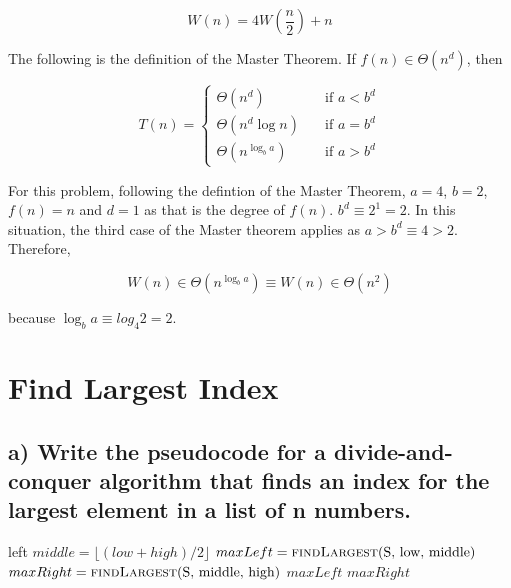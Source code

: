 \documentclass[11pt]{article}
\begin{document}
\begin{equation*}
W(n) = 4W(\frac{n}{2}) +n
\end{equation*}


\bigskip
\bigskip

The following is the definition of the Master Theorem. If $f(n) \in \Theta (n^d)$, then

\[ T(n) =
  \begin{cases}
    \Theta (n^d)       & \quad \text{if }   \text{$a < b^d$}\\
    \Theta (n^d \log n)    & \quad \text{if }  \text{$a = b^d$}\\
    \Theta (n^{\log_b a})  & \quad \text{if }  \text{$a > b^d$}
  \end{cases}
\]


\bigskip
\bigskip
\bigskip



For this problem, following the defintion of the Master Theorem, $a=4$, $b=2$, $f(n)=n$ and $d=1$ as that is the degree of $f(n)$. $b^d \equiv 2^1=2$. In this situation, the third case of the Master theorem applies as $a>b^d \equiv 4>2$. Therefore, 

\begin{equation*}
W(n) \in \Theta (n^{\log_b a}) \equiv W(n) \in \Theta (n^2)
\end{equation*}

\noindent because $\log_b a \equiv log_4 2 = 2$.



\section{Find Largest Index}%


\subsection*{a) Write the pseudocode for a divide-and-conquer algorithm that finds an index for the largest element in a list of n numbers.}

\bigskip
\bigskip


\begin{algorithmic}

 
	\State \Return left 
\EndIf
\State $middle = \lfloor (low + high)/2 \rfloor$
\State $maxLeft = \Call{findLargest}{$S, low, middle$}$
\State $maxRight = \Call{findLargest}{$S, middle, high$}$
	\State \Return $maxLeft$
\Else
	\State \Return $maxRight$
\EndIf
\EndFunction

\end{algorithmic}
\end{document}

